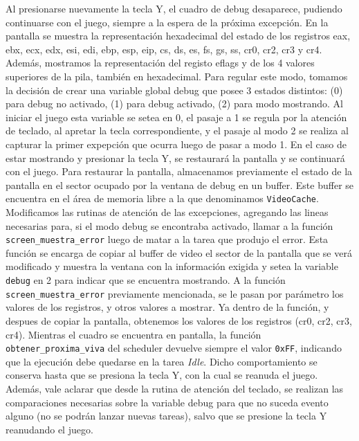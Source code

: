 \begin{enumerate}
Al presionarse nuevamente la tecla Y, el cuadro de debug desaparece, pudiendo continuarse con el juego, siempre a la espera de la próxima excepción.
En la pantalla se muestra la representación hexadecimal del estado de los registros eax, ebx, ecx, edx, esi, edi, ebp, esp, eip, cs, ds, es, fs, gs, ss, cr0, cr2, cr3 y cr4. Además, mostramos la representación del registo eflags y de los 4 valores superiores de la pila, también en hexadecimal.
Para regular este modo, tomamos la decisión de crear una variable global debug que posee 3 estados distintos: (0) para debug no activado, (1) para debug activado, (2) para modo mostrando. Al iniciar el juego esta variable se setea en 0, el pasaje a 1 se regula por la atención de teclado, al apretar la tecla correspondiente, y el pasaje al modo 2 se realiza al capturar la primer expepción que ocurra luego de pasar a modo 1.
En el caso de estar mostrando y presionar la tecla Y, se restaurará la pantalla y se continuará con el juego. Para restaurar la pantalla, almacenamos previamente el estado de la pantalla en el sector ocupado por la ventana de debug en un buffer. Este buffer se encuentra en el área de memoria libre a la que denominamos {\tt VideoCache}.
Modificamos las rutinas de atención de las excepciones, agregando las lineas necesarias para, si el modo debug se encontraba activado, llamar a la función {\tt screen\_muestra\_error} luego de matar a la tarea que produjo el error. Esta función se encarga de copiar al buffer de video el sector de la pantalla que se verá modificado y muestra la ventana con la información exigida y setea la variable {\tt debug} en 2 para indicar que se encuentra mostrando.
A la función {\tt screen\_muestra\_error} previamente mencionada, se le pasan por parámetro los valores de los registros, y otros valores a mostrar. Ya dentro de la función,  y despues de copiar la pantalla, obtenemos los valores de los registros (cr0, cr2, cr3, cr4).
Mientras el cuadro se encuentra en pantalla, la función {\tt obtener\_proxima\_viva} del scheduler devuelve siempre el valor {\tt 0xFF}, indicando que la ejecución debe quedarse en la tarea \textit{Idle}. Dicho comportamiento se conserva hasta que se presiona la tecla Y, con la cual se reanuda el juego. Además, vale aclarar que desde la rutina de atención del teclado, se realizan las comparaciones necesarias sobre la variable debug para que no suceda evento alguno (no se podrán lanzar nuevas tareas), salvo que se presione la tecla Y reanudando el juego.


\end{enumerate}
